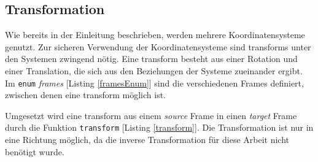 \subsection{Transformation}
\label{sec_transformations}
Wie bereits in der Einleitung beschrieben, werden mehrere Koordinatensysteme genutzt. Zur sicheren Verwendung der Koordinatensysteme sind \glspl{transform} unter den Systemen zwingend nötig.
Eine \gls{transform} besteht aus einer Rotation und einer Translation, die sich aus den Beziehungen der Systeme zueinander ergibt.\\
Im \texttt{enum} \textit{frames} [Listing \ref{framesEnum}] sind die verschiedenen Frames definiert, zwischen denen eine \gls{transform} möglich ist.



Umgesetzt wird eine \gls{transform} aus einem \textit{source} Frame in einen \textit{target} Frame durch die Funktion \texttt{transform} [Listing \ref{transform}]. Die Transformation ist nur in eine Richtung möglich, da die inverse Transformation für diese Arbeit nicht benötigt wurde.




